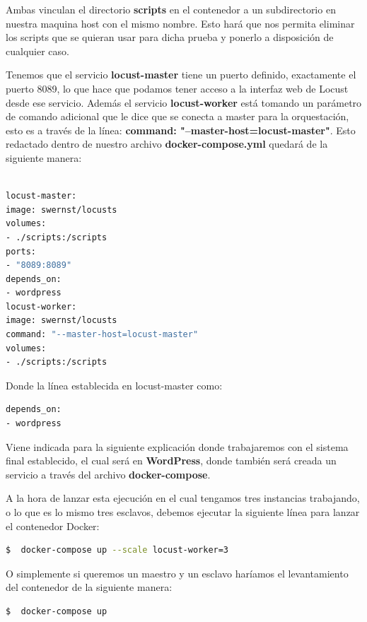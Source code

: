 Ambas vinculan el directorio \textbf{scripts} en el contenedor a un subdirectorio en nuestra maquina host con el mismo nombre. Esto hará que nos permita eliminar los scripts que se quieran usar para dicha prueba y ponerlo a disposición de cualquier caso.

Tenemos que el servicio \textbf{locust-master} tiene un puerto definido, exactamente el puerto 8089, lo que hace que podamos tener acceso a la interfaz web de Locust desde ese servicio.
Además el servicio \textbf{locust-worker} está tomando un parámetro de comando adicional que le dice que se conecta a master para la orquestación, esto es a través de la línea: \textbf{command: "--master-host=locust-master"}.
\newpage
Esto redactado dentro de nuestro archivo \textbf{docker-compose.yml} quedará de la siguiente manera:
\begin{lstlisting}[language=bash]
  
locust-master:
image: swernst/locusts
volumes:
- ./scripts:/scripts
ports:
- "8089:8089"
depends_on:
- wordpress
locust-worker:
image: swernst/locusts
command: "--master-host=locust-master"
volumes:
- ./scripts:/scripts


\end{lstlisting}

Donde la línea establecida en locust-master como: 

\begin{lstlisting}[language=bash]
depends_on:
- wordpress
\end{lstlisting}

Viene indicada para la siguiente explicación donde trabajaremos con el sistema final establecido, el cual será en \textbf{WordPress}, donde también será creada un servicio a través del archivo \textbf{docker-compose}.

A la hora de lanzar esta ejecución en el cual tengamos tres instancias trabajando, o lo que es lo mismo tres esclavos, debemos ejecutar la siguiente línea para lanzar el contenedor Docker:

\begin{lstlisting}[language=bash]
$  docker-compose up --scale locust-worker=3 
\end{lstlisting}

O simplemente si queremos un maestro y un esclavo haríamos el levantamiento del contenedor de la siguiente manera:

\begin{lstlisting}[language=bash]
$  docker-compose up 
\end{lstlisting}
\newpage
